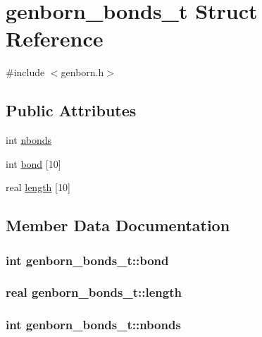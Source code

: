 \hypertarget{structgenborn__bonds__t}{\section{genborn\-\_\-bonds\-\_\-t \-Struct \-Reference}
\label{structgenborn__bonds__t}
}


{\ttfamily \#include $<$genborn.\-h$>$}

\subsection*{\-Public \-Attributes}
\begin{DoxyCompactItemize}
\item 
int \hyperlink{structgenborn__bonds__t_aa8242bd4fd6f9793261ba6461eff42b9}{nbonds}
\item 
int \hyperlink{structgenborn__bonds__t_aeea567a54784345024ead8367122e2f9}{bond} \mbox{[}10\mbox{]}
\item 
real \hyperlink{structgenborn__bonds__t_af5388cc328ff906f363edc6563a1f5d6}{length} \mbox{[}10\mbox{]}
\end{DoxyCompactItemize}


\subsection{\-Member \-Data \-Documentation}
\hypertarget{structgenborn__bonds__t_aeea567a54784345024ead8367122e2f9}{
\subsubsection[{bond}]{\setlength{\rightskip}{0pt plus 5cm}int {\bf genborn\-\_\-bonds\-\_\-t\-::bond}}}\label{structgenborn__bonds__t_aeea567a54784345024ead8367122e2f9}
\hypertarget{structgenborn__bonds__t_af5388cc328ff906f363edc6563a1f5d6}{
\subsubsection[{length}]{\setlength{\rightskip}{0pt plus 5cm}real {\bf genborn\-\_\-bonds\-\_\-t\-::length}}}\label{structgenborn__bonds__t_af5388cc328ff906f363edc6563a1f5d6}
\hypertarget{structgenborn__bonds__t_aa8242bd4fd6f9793261ba6461eff42b9}{
\subsubsection[{nbonds}]{\setlength{\rightskip}{0pt plus 5cm}int {\bf genborn\-\_\-bonds\-\_\-t\-::nbonds}}}\label{structgenborn__bonds__t_aa8242bd4fd6f9793261ba6461eff42b9}


